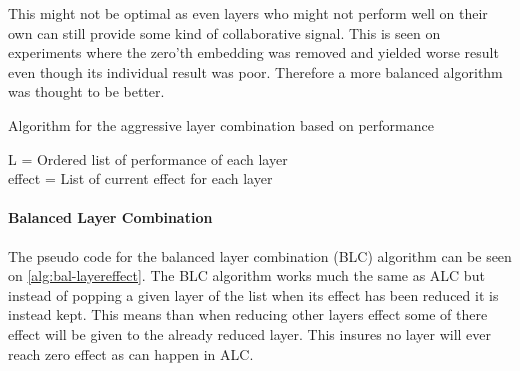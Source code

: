 This might not be optimal as even layers who might not perform well on their own can still provide some kind of collaborative signal.
This is seen on experiments where the zero'th embedding was removed and yielded worse result even though its individual result was poor.
Therefore a more balanced algorithm was thought to be better.

\begin{algorithm}
    \caption{Algorithm for the aggressive layer combination based on performance}
    \SetAlgoLined
    L = Ordered list of performance of each layer \\
    effect  = List of current effect for each layer \\
    \label{alg:aggresive-layereffect}
\end{algorithm}


\paragraph{Balanced Layer Combination}
The pseudo code for the balanced layer combination (BLC) algorithm can be seen on \autoref{alg:bal-layereffect}.
The BLC algorithm works much the same as ALC but instead of popping a given layer of the list when its effect has been reduced it is instead kept.
This means than when reducing other layers effect some of there effect will be given to the already reduced layer.
This insures no layer will ever reach zero effect as can happen in ALC.



